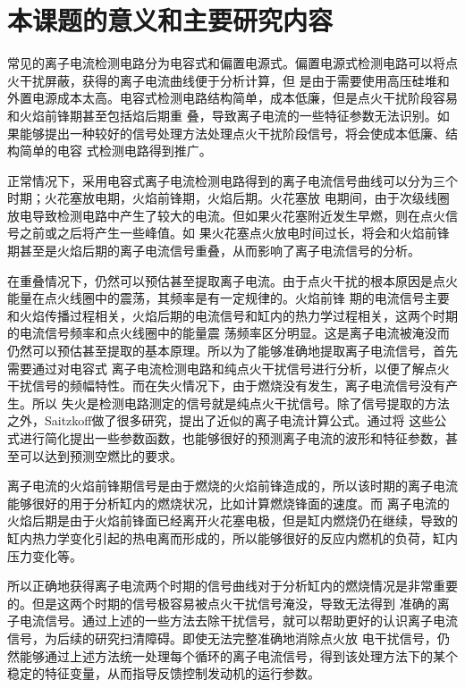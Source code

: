 \section{本课题的意义和主要研究内容}
常见的离子电流检测电路分为电容式和偏置电源式。偏置电源式检测电路可以将点火干扰屏蔽，获得的离子电流曲线便于分析计算\cite{cyb2012}，但
是由于需要使用高压硅堆和外置电源成本太高。电容式检测电路结构简单，成本低廉，但是点火干扰阶段容易和火焰前锋期甚至包括焰后期重
叠，导致离子电流的一些特征参数无法识别。如果能够提出一种较好的信号处理方法处理点火干扰阶段信号，将会使成本低廉、结构简单的电容
式检测电路得到推广。
\par 正常情况下，采用电容式离子电流检测电路得到的离子电流信号曲线可以分为三个时期；火花塞放电期，火焰前锋期，火焰后期。火花塞放
电期间，由于次级线圈放电导致检测电路中产生了较大的电流。但如果火花塞附近发生早燃，则在点火信号之前或之后将产生一些峰值\cite{eriksson1997closed}。如
果火花塞点火放电时间过长，将会和火焰前锋期甚至是火焰后期的离子电流信号重叠，从而影响了离子电流信号的分析。
\par 在重叠情况下，仍然可以预估甚至提取离子电流。由于点火干扰的根本原因是点火能量在点火线圈中的震荡，其频率是有一定规律的。火焰前锋
期的电流信号主要和火焰传播过程相关，火焰后期的电流信号和缸内的热力学过程相关，这两个时期的电流信号频率和点火线圈中的能量震
荡频率区分明显。这是离子电流被淹没而仍然可以预估甚至提取的基本原理。所以为了能够准确地提取离子电流信号，首先需要通过对电容式
离子电流检测电路和纯点火干扰信号进行分析，以便了解点火干扰信号的频幅特性。而在失火情况下，由于燃烧没有发生，离子电流信号没有产生。所以
失火是检测电路测定的信号就是纯点火干扰信号。除了信号提取的方法之外，Saitzkoff\cite{saitzkoff1996ionization}做了很多研究，提出了近似的离子电流计算公式。通过将
这些公式进行简化提出一些参数函数，也能够很好的预测离子电流的波形和特征参数，甚至可以达到预测空燃比的要求。
\par 离子电流的火焰前锋期信号是由于燃烧的火焰前锋造成的，所以该时期的离子电流能够很好的用于分析缸内的燃烧状况，比如计算燃烧锋面的速度。而
离子电流的火焰后期是由于火焰前锋面已经离开火花塞电极，但是缸内燃烧仍在继续，导致的缸内热力学变化引起的热电离而形成的，所以能够很好的反应内燃机的负荷，缸内压力变化等。
\par 所以正确地获得离子电流两个时期的信号曲线对于分析缸内的燃烧情况是非常重要的。但是这两个时期的信号极容易被点火干扰信号淹没，导致无法得到
准确的离子电流信号。通过上述的一些方法去除干扰信号，就可以帮助更好的认识离子电流信号，为后续的研究扫清障碍。即使无法完整准确地消除点火放
电干扰信号，仍然能够通过上述方法统一处理每个循环的离子电流信号，得到该处理方法下的某个稳定的特征变量，从而指导反馈控制发动机的运行参数。
